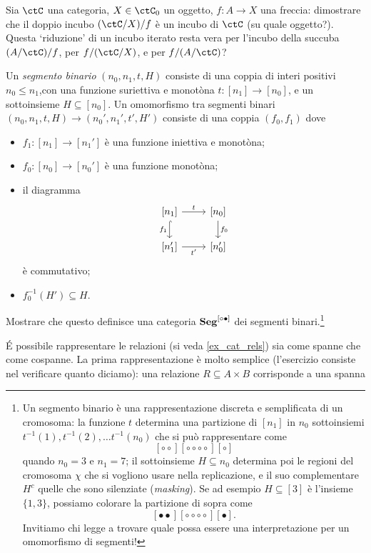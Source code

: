 \begin{esercizi}
 \item Sia \(\ctC\) una categoria, \(X\in\ctC_0\) un oggetto, \(f \colon A\to X\) una freccia: dimostrare che il doppio incubo \((\ctC/X)/f\) è un incubo di \(\ctC\) (su quale oggetto?). Questa `riduzione' di un incubo iterato resta vera per l'incubo della succuba \((A/\ctC)/f\), per \(f/(\ctC/X)\), e per \(f/(A/\ctC)\)?
 \item Un \emph{segmento binario} \((n_0,n_1,t,H)\) consiste di una coppia di interi positivi \(n_0 \le n_1\),con una funzione suriettiva e monotòna \(t \colon [n_1] \to [n_0]\), e un sottoinsieme \(H\subseteq [n_0]\). Un omomorfismo tra segmenti binari \((n_0,n_1,t,H) \to (n_0',n_1',t',H')\) consiste di una coppia \((f_0,f_1)\) dove
 \begin{itemize}
  \item \(f_1 \colon [n_1] \to [n_1']\) è una funzione iniettiva e monotòna;
  \item \(f_0 \colon [n_0] \to [n_0']\) è una funzione monotòna;
  \item il diagramma
        \[\begin{tikzcd}
          {[n_1]}\ar[r, "t"]\ar[d, hook, "{f_1}"'] & {[n_0]} \ar[d, "f_0"]\\
          {[n_1']} \ar[r, "{t'}"'] & {[n_0']}
         \end{tikzcd}\]
        è commutativo;
  \item \(f_0^{-1}(H')\subseteq H\).
 \end{itemize}
 Mostrare che questo definisce una categoria \(\mathbf{Seg}^{[{\circ}{\bullet}]}\) dei segmenti binari.\footnote{Un segmento binario è una rappresentazione discreta e semplificata di un cromosoma: la funzione \(t\) determina una partizione di \([n_1]\) in \(n_0\) sottoinsiemi \(t^{-1}(1),t^{-1}(2),\dots t^{-1}(n_0)\) che si può rappresentare come
 \[[{\circ}{\circ}][{\circ}{\circ}{\circ}{\circ}][{\circ}]\]
 quando \(n_0=3\) e \(n_1=7\); il sottoinsieme \(H\subseteq n_0\) determina poi le regioni del cromosoma \(\chi\) che si vogliono usare nella replicazione, e il suo complementare \(H^c\) quelle che sono silenziate (\emph{masking}). Se ad esempio \(H\subseteq [3]\) è l'insieme \(\{1,3\}\), possiamo colorare la partizione di sopra come
 \[[{\bullet}{\bullet}][{\circ}{\circ}{\circ}{\circ}][{\bullet}].\]
 Invitiamo chi legge a trovare quale possa essere una interpretazione per un omomorfismo di segmenti!}
 \item É possibile rappresentare le relazioni (si veda \ref{ex_cat_rels}) sia come spanne che come cospanne. La prima rappresentazione è molto semplice (l'esercizio consiste nel verificare quanto diciamo): una relazione \(R\subseteq A\times B\) corrisponde a una spanna

\end{esercizi}
